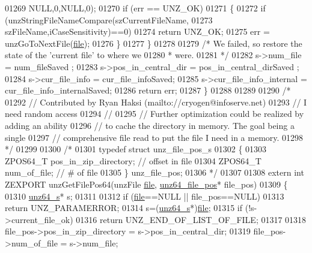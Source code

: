 \begin{DoxyCode}
01269                                     NULL,0,NULL,0);
01270         \textcolor{keywordflow}{if} (err == UNZ\_OK)
01271         \{
01272             \textcolor{keywordflow}{if} (unzStringFileNameCompare(szCurrentFileName,
01273                                             szFileName,iCaseSensitivity)==0)
01274                 \textcolor{keywordflow}{return} UNZ\_OK;
01275             err = unzGoToNextFile(\hyperlink{structfile}{file});
01276         \}
01277     \}
01278 
01279     \textcolor{comment}{/* We failed, so restore the state of the 'current file' to where we}
01280 \textcolor{comment}{     * were.}
01281 \textcolor{comment}{     */}
01282     s->num\_file = num\_fileSaved ;
01283     s->pos\_in\_central\_dir = pos\_in\_central\_dirSaved ;
01284     s->cur\_file\_info = cur\_file\_infoSaved;
01285     s->cur\_file\_info\_internal = cur\_file\_info\_internalSaved;
01286     \textcolor{keywordflow}{return} err;
01287 \}
01288 
01289 
01290 \textcolor{comment}{/*}
01292 \textcolor{comment}{// Contributed by Ryan Haksi (mailto://cryogen@infoserve.net)}
01293 \textcolor{comment}{// I need random access}
01294 \textcolor{comment}{//}
01295 \textcolor{comment}{// Further optimization could be realized by adding an ability}
01296 \textcolor{comment}{// to cache the directory in memory. The goal being a single}
01297 \textcolor{comment}{// comprehensive file read to put the file I need in a memory.}
01298 \textcolor{comment}{*/}
01299 
01300 \textcolor{comment}{/*}
01301 \textcolor{comment}{typedef struct unz\_file\_pos\_s}
01302 \textcolor{comment}{\{}
01303 \textcolor{comment}{    ZPOS64\_T pos\_in\_zip\_directory;   // offset in file}
01304 \textcolor{comment}{    ZPOS64\_T num\_of\_file;            // # of file}
01305 \textcolor{comment}{\} unz\_file\_pos;}
01306 \textcolor{comment}{*/}
01307 
01308 \textcolor{keyword}{extern} \textcolor{keywordtype}{int} ZEXPORT unzGetFilePos64(unzFile \hyperlink{structfile}{file}, \hyperlink{structunz64__file__pos__s}{unz64\_file\_pos}*  file\_pos)
01309 \{
01310     \hyperlink{structunz64__s}{unz64\_s}* s;
01311 
01312     \textcolor{keywordflow}{if} (\hyperlink{structfile}{file}==NULL || file\_pos==NULL)
01313         \textcolor{keywordflow}{return} UNZ\_PARAMERROR;
01314     s=(\hyperlink{structunz64__s}{unz64\_s}*)\hyperlink{structfile}{file};
01315     \textcolor{keywordflow}{if} (!s->current\_file\_ok)
01316         \textcolor{keywordflow}{return} UNZ\_END\_OF\_LIST\_OF\_FILE;
01317 
01318     file\_pos->pos\_in\_zip\_directory  = s->pos\_in\_central\_dir;
01319     file\_pos->num\_of\_file           = s->num\_file;

\end{DoxyCode}
